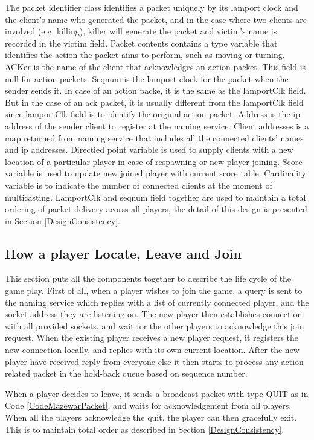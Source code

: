 The packet identifier class identifies a packet uniquely by its lamport clock and the client's name who generated the packet, and in the case where two clients are involved (e.g. killing), killer will generate the packet and victim's name is recorded in the victim field. Packet contents contains a type variable that identifies the action the packet aims to perform, such as moving or turning. ACKer is the name of the client that acknowledges an action packet. This field is null for action packets. Seqnum is the lamport clock for the packet when the sender sends it. In case of an action packe, it is the same as the lamportClk field. But in the case of an ack packet, it is usually different from the lamportClk field since lamportClk field is to identify the original action packet. Address is the ip address of the sender client to register at the naming service. Client addresses is a map returned from naming service that includes all the connected clients' names and ip addresses. Directied point variable is used to supply clients with a new location of a particular player in case of respawning or new player joining. Score variable is used to update new joined player with current score table. Cardinality variable is to indicate the number of connected clients at the moment of multicasting. LamportClk and seqnum field together are used to maintain a total ordering of packet delivery acorss all players, the detail of this design is presented in Section \ref{DesignConsistency}.

\subsection{How a player Locate, Leave and Join}\label{DesignGameFlow}

This section puts all the components together to describe the life cycle of the game play. First of all, when a player wishes to join the game, a query is sent to the naming service which replies with a list of currently connected player, and the socket address they are listening on. The new player then establishes connection with all provided sockets, and wait for the other players to acknowledge this join request. When the existing player receives a new player request, it registers the new connection locally, and replies with its own current location. After the new player have received reply from everyone else it then starts to process any action related packet in the hold-back queue based on sequence number.

When a player decides to leave, it sends a broadcast packet with type QUIT as in Code \ref{CodeMazewarPacket}, and waits for acknowledgement from all players. When all the players acknowledge the quit, the player can then gracefully exit. This is to maintain total order as described in Section \ref{DesignConsistency}.

